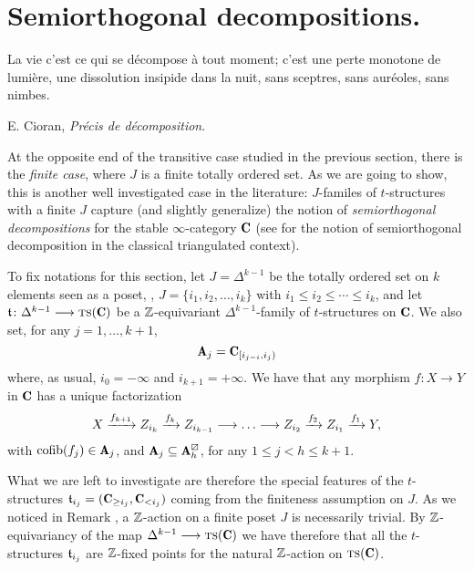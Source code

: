 \section{Semiorthogonal decompositions.}
\setlength{\epigraphwidth}{.75\textwidth}
\epigraph{La vie c'est ce qui se décompose à tout moment; c'est une perte monotone de lumière, une dissolution insipide dans la nuit, sans sceptres, sans auréoles, sans nimbes.}{E. Cioran, \emph{Pr\'ecis de décomposition}.}
\setlength{\epigraphwidth}{\DefaultEpigraphWidth}
At the opposite end of the transitive case studied in the previous section, there is the \emph{finite case}, where $J$ is a finite totally ordered set. As we are going to show, this is another well investigated case in the literature: $J$-familes of $t$-structures with a finite $J$ capture (and slightly generalize) the notion of \emph{semiorthogonal decompositions} for the stable $\infty$-category $\C$ (see \cite{Bondal1995, Kuz} for the notion of semiorthogonal decomposition in the classical triangulated context).

To fix notations for this section, let $J=\Delta^{k-1}$ be the totally ordered set on $k$ elements seen as a poset, \ie, $J=\{i_1,i_2,\dots,i_k\}$ with $i_1\leq i_2\leq\cdots\leq i_k$, and let $\tee\colon \Delta^{k-1}\to \ts(\C)$ be a $\mathbb{Z} $-equivariant $\Delta^{k-1}$-family of $t$-structures on $\C$. We also set, for any $j=1,\dots,k+1$,
\[
\cate{A}_j=\C_{[i_{j-i}, i_j)}
\]
where, as usual, $i_0=-\infty$ and $i_{k+1}=+\infty$. We have that any morphism $f\colon X\to Y$ in $\C$ has a unique factorization
\[
X \xto{f_{k+1}} Z_{i_k} \xto{f_k}Z_{i_{k-1}}\to\dots\to Z_{i_{2}} \xto{f_2} Z_{i_1} \xto{f_1} Y,
\]
with $\cofib(f_j)\in \cate{A}_j$, and $\cate{A}_j\subseteq \cate{A}_h^\orth$, for any $1\leq j <h\leq k+1$. 

What we are left to investigate are therefore the special features of the $t$-structures $\tee_{i_j}=(\C_{\geq i_j},\C_{< i_j})$ coming from the finiteness assumption on $J$.
As we noticed in Remark , a $\mathbb{Z} $-action on a finite poset $J$ is necessarily trivial. By $\mathbb{Z} $-equivariancy of the map $\Delta^{k-1}\to \ts(\C)$ we have therefore that all the $t$-structures $\mathfrak{t}_{i_j}$ are $\mathbb{Z} $-fixed points for the natural $\mathbb{Z} $-action on $ \ts(\C)$. 

